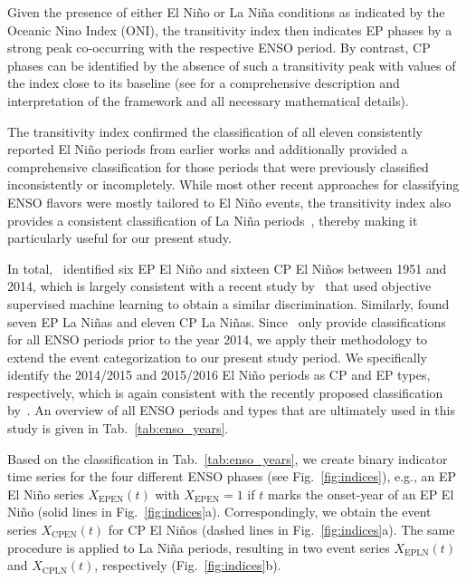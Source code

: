 \documentclass[utf8]{frontiersSCNS} %
\begin{document}
Given the presence of either El Ni\~no or La Ni\~na conditions as indicated by the Oceanic Nino Index (ONI), the transitivity index then indicates EP phases by a strong peak co-occurring with the respective ENSO period. By contrast, CP phases can be identified by the absence of such a transitivity peak with values of the index close to its baseline (see \cite{wiedermann_climate_2016} for a comprehensive description and interpretation of the framework and all necessary mathematical details). 

The transitivity index confirmed the classification of all eleven consistently reported El Ni\~no periods from earlier works and additionally provided a comprehensive classification for those periods that were previously classified inconsistently or incompletely. While most other recent approaches for classifying ENSO flavors were mostly tailored to El Ni\~no events, the transitivity index also provides a consistent classification of La Ni\~na periods~\citep{wiedermann_climate_2016}, thereby making it particularly useful for our present study. 

In total,~\cite{wiedermann_climate_2016} identified six EP El Ni\~no and sixteen CP El Ni\~nos between 1951 and 2014, which is largely consistent with a recent study by~\cite{freund2019higher} that used objective supervised machine learning to obtain a similar discrimination. Similarly, \cite{wiedermann_climate_2016} found seven EP La Ni\~nas and eleven CP La Ni\~nas. Since~\cite{wiedermann_climate_2016} only provide classifications for all ENSO periods prior to the year 2014, we apply their methodology to extend the event categorization to our present study period. We specifically identify the 2014/2015 and 2015/2016 El Ni\~no periods as CP and EP types, respectively, which is again consistent with the recently proposed classification by~\cite{freund2019higher}. An overview of all ENSO periods and types that are ultimately used in this study is given in Tab.~\ref{tab:enso_years}.

Based on the classification in Tab.~\ref{tab:enso_years}, we create binary indicator time series for the four different ENSO phases (see Fig.~\ref{fig:indices}), e.g., an EP El Ni\~no series $X_\text{EPEN}(t)$ with $X_\text{EPEN}=1$ if $t$ marks the onset-year of an EP El Ni\~no (solid lines in Fig.~\ref{fig:indices}a). Correspondingly, we obtain the event series $X_\text{CPEN}(t)$ for CP El Ni\~nos (dashed lines in Fig.~\ref{fig:indices}a). The same procedure is applied to La Ni\~na periods, resulting in two event series $X_\text{EPLN}(t)$ and $X_\text{CPLN}(t)$, respectively (Fig.~\ref{fig:indices}b).\\\\
\end{document}
